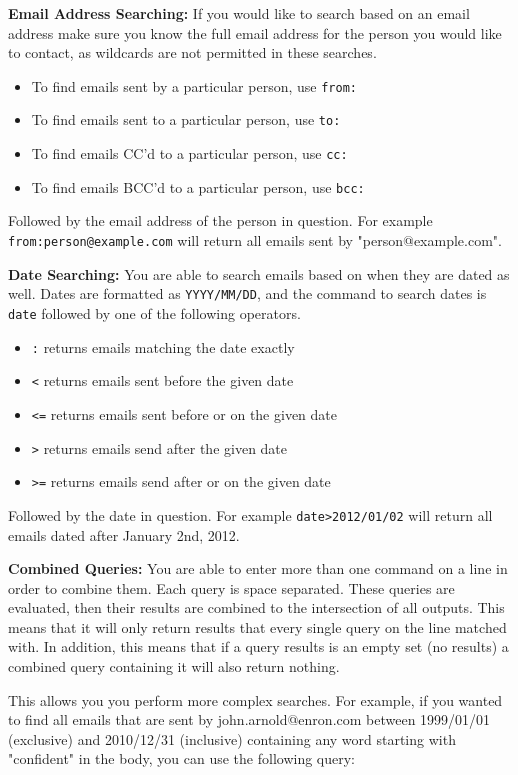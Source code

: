 \textbf{Email Address Searching: }
If you would like to search based on an email address make sure you know the full email address 
for the person you would like to contact, as wildcards are not permitted in these searches.  
\begin{itemize}
	\item To find emails sent by a particular person, use \verb|from:|
	\item To find emails sent to a particular person, use \verb|to:|
	\item To find emails CC'd to a particular person, use \verb|cc:|
	\item To find emails BCC'd to a particular person, use \verb|bcc:|
\end{itemize}
Followed by the email address of the person in question.  For example \verb|from:person@example.com| 
will return all emails sent by "person@example.com".  

\textbf{Date Searching: }
You are able to search emails based on when they are dated as well.  Dates are formatted as 
\verb|YYYY/MM/DD|, and the command to search dates is \verb|date| followed by one of the following 
operators.  
\begin{itemize}
	\item \verb|:| returns emails matching the date exactly
	\item \verb|<| returns emails sent before the given date
	\item \verb|<=| returns emails sent before or on the given date
	\item \verb|>| returns emails send after the given date
	\item \verb|>=| returns emails send after or on the given date
\end{itemize}
Followed by the date in question.  For example \verb|date>2012/01/02| will return all emails dated 
after January 2nd, 2012.  

\textbf{Combined Queries: }
You are able to enter more than one command on a line in order to combine them.  Each query is 
space separated.  These queries are evaluated, then their results are combined to the intersection 
of all outputs.  This means that it will only return results that every single query on the line 
matched with.  In addition, this means that if a query results is an empty set (no results) a 
combined query containing it will also return nothing.  

This allows you you perform more complex searches.  For example, if you wanted to find all emails 
that are sent by john.arnold@enron.com between 1999/01/01 (exclusive) and 2010/12/31 (inclusive) 
containing any word starting with "confident" in the body, you can use the following query:

